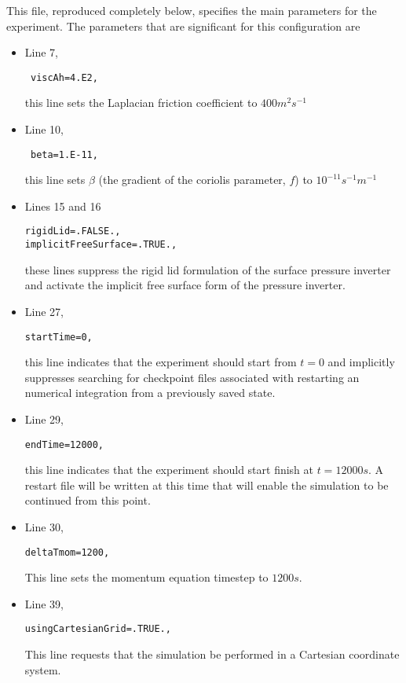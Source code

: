 This file, reproduced completely below, specifies the main parameters 
for the experiment. The parameters that are significant for this configuration
are

\begin{itemize}

\item Line 7, \begin{verbatim} viscAh=4.E2, \end{verbatim} this line sets
the Laplacian friction coefficient to $400 m^2s^{-1}$
\item Line 10, \begin{verbatim} beta=1.E-11, \end{verbatim} this line sets
$\beta$ (the gradient of the coriolis parameter, $f$) to $10^{-11} s^{-1}m^{-1}$

\item Lines 15 and 16
\begin{verbatim}
rigidLid=.FALSE.,
implicitFreeSurface=.TRUE.,
\end{verbatim}
these lines suppress the rigid lid formulation of the surface
pressure inverter and activate the implicit free surface form
of the pressure inverter.

\item Line 27,
\begin{verbatim}
startTime=0,
\end{verbatim}
this line indicates that the experiment should start from $t=0$
and implicitly suppresses searching for checkpoint files associated
with restarting an numerical integration from a previously saved state.

\item Line 29,
\begin{verbatim}
endTime=12000,
\end{verbatim}
this line indicates that the experiment should start finish at $t=12000s$.
A restart file will be written at this time that will enable the
simulation to be continued from this point.

\item Line 30,
\begin{verbatim}
deltaTmom=1200,
\end{verbatim}
This line sets the momentum equation timestep to $1200s$.

\item Line 39,
\begin{verbatim}
usingCartesianGrid=.TRUE.,
\end{verbatim}
This line requests that the simulation be performed in a 
Cartesian coordinate system.


\end{itemize}
